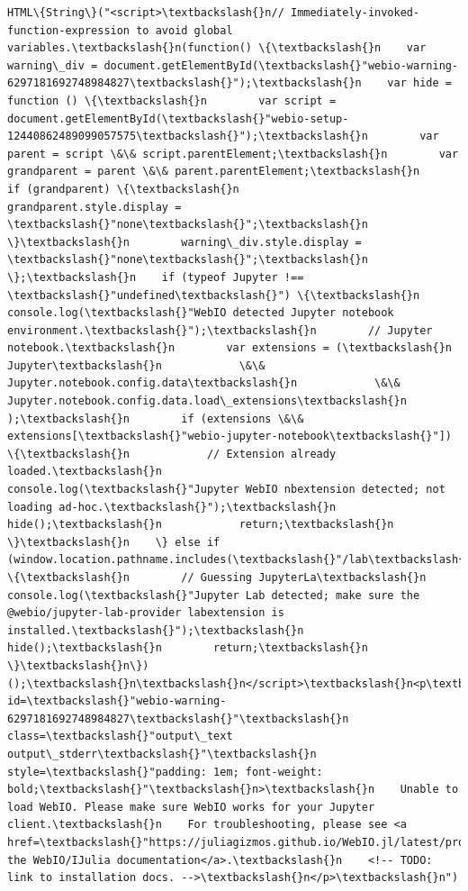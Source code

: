 \documentclass[11pt]{article}
\begin{document}
    
    \begin{Verbatim}[commandchars=\\\{\}]
HTML\{String\}("<script>\textbackslash{}n// Immediately-invoked-function-expression to avoid global variables.\textbackslash{}n(function() \{\textbackslash{}n    var warning\_div = document.getElementById(\textbackslash{}"webio-warning-6297181692748984827\textbackslash{}");\textbackslash{}n    var hide = function () \{\textbackslash{}n        var script = document.getElementById(\textbackslash{}"webio-setup-12440862489099057575\textbackslash{}");\textbackslash{}n        var parent = script \&\& script.parentElement;\textbackslash{}n        var grandparent = parent \&\& parent.parentElement;\textbackslash{}n        if (grandparent) \{\textbackslash{}n            grandparent.style.display = \textbackslash{}"none\textbackslash{}";\textbackslash{}n        \}\textbackslash{}n        warning\_div.style.display = \textbackslash{}"none\textbackslash{}";\textbackslash{}n    \};\textbackslash{}n    if (typeof Jupyter !== \textbackslash{}"undefined\textbackslash{}") \{\textbackslash{}n        console.log(\textbackslash{}"WebIO detected Jupyter notebook environment.\textbackslash{}");\textbackslash{}n        // Jupyter notebook.\textbackslash{}n        var extensions = (\textbackslash{}n            Jupyter\textbackslash{}n            \&\& Jupyter.notebook.config.data\textbackslash{}n            \&\& Jupyter.notebook.config.data.load\_extensions\textbackslash{}n        );\textbackslash{}n        if (extensions \&\& extensions[\textbackslash{}"webio-jupyter-notebook\textbackslash{}"]) \{\textbackslash{}n            // Extension already loaded.\textbackslash{}n            console.log(\textbackslash{}"Jupyter WebIO nbextension detected; not loading ad-hoc.\textbackslash{}");\textbackslash{}n            hide();\textbackslash{}n            return;\textbackslash{}n        \}\textbackslash{}n    \} else if (window.location.pathname.includes(\textbackslash{}"/lab\textbackslash{}")) \{\textbackslash{}n        // Guessing JupyterLa\textbackslash{}n        console.log(\textbackslash{}"Jupyter Lab detected; make sure the @webio/jupyter-lab-provider labextension is installed.\textbackslash{}");\textbackslash{}n        hide();\textbackslash{}n        return;\textbackslash{}n    \}\textbackslash{}n\})();\textbackslash{}n\textbackslash{}n</script>\textbackslash{}n<p\textbackslash{}n    id=\textbackslash{}"webio-warning-6297181692748984827\textbackslash{}"\textbackslash{}n    class=\textbackslash{}"output\_text output\_stderr\textbackslash{}"\textbackslash{}n    style=\textbackslash{}"padding: 1em; font-weight: bold;\textbackslash{}"\textbackslash{}n>\textbackslash{}n    Unable to load WebIO. Please make sure WebIO works for your Jupyter client.\textbackslash{}n    For troubleshooting, please see <a href=\textbackslash{}"https://juliagizmos.github.io/WebIO.jl/latest/providers/ijulia/\textbackslash{}">\textbackslash{}n    the WebIO/IJulia documentation</a>.\textbackslash{}n    <!-- TODO: link to installation docs. -->\textbackslash{}n</p>\textbackslash{}n")
    \end{Verbatim}
\end{document}
